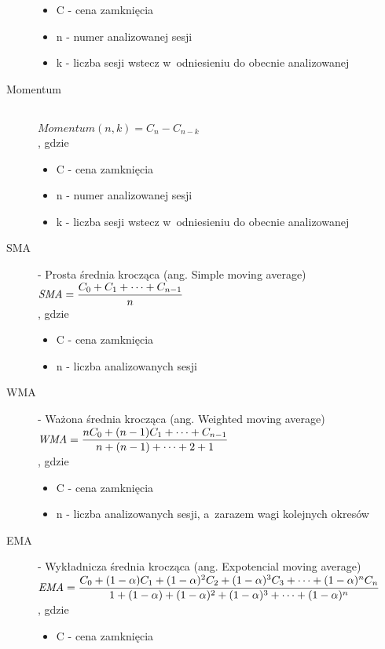 \begin{description}
\begin{itemize}
				\item C - cena zamknięcia
				\item n - numer analizowanej sesji
				\item k - liczba sesji wstecz w~odniesieniu do obecnie analizowanej
			\end{itemize}
	\item[Momentum] \hfill \\
		$\displaystyle Momentum(n, k) = C_n - C_{n-k}$ \\
		, gdzie \hfill
			\begin{itemize}
				\item C - cena zamknięcia
				\item n - numer analizowanej sesji
				\item k - liczba sesji wstecz w~odniesieniu do obecnie analizowanej
			\end{itemize}
	\item[SMA] - Prosta średnia krocząca (ang. Simple moving average) \hfill \\
		$\displaystyle \textit{SMA} = { C_{0} + C_{1} + \cdots + C_{n-1} \over n }$ \\
		, gdzie \hfill
			\begin{itemize}
				\item C - cena zamknięcia
				\item n - liczba analizowanych sesji
			\end{itemize}
	\item[WMA] - Ważona średnia krocząca (ang. Weighted moving average) \hfill \\
		$\displaystyle \textit{WMA} = { n C_{0} + (n-1) C_{1} + \cdots + C_{n-1} \over n + (n-1) + \cdots + 2 + 1}$ \\
		, gdzie \hfill
			\begin{itemize}
				\item C - cena zamknięcia
				\item n - liczba analizowanych sesji, a~zarazem wagi kolejnych okresów
			\end{itemize}
	\item[EMA] - Wykładnicza średnia krocząca (ang. Expotencial moving average) \hfill \\
		$\displaystyle \textit{EMA} = { C_0 + (1-\alpha) C_1 + (1-\alpha)^2 C_2 + (1-\alpha)^3 C_3 + \cdots + (1-\alpha)^n C_n \over 1 + (1-\alpha) + (1-\alpha)^2 + (1-\alpha)^3 + \cdots + (1-\alpha)^n}$ \\
		, gdzie \hfill
			\begin{itemize}
				\item C - cena zamknięcia

\end{itemize}
\end{description}

